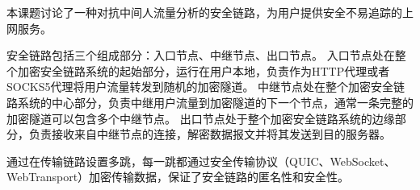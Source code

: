 \begin{conclusions}
本课题讨论了一种对抗中间人流量分析的安全链路，为用户提供安全不易追踪的上网服务。

安全链路包括三个组成部分：入口节点、中继节点、出口节点。
入口节点处在整个加密安全链路系统的起始部分，运行在用户本地，负责作为HTTP代理或者SOCKS5代理将用户流量转发到随机的加密隧道。
中继节点处在整个加密安全链路系统的中心部分，负责中继用户流量到加密隧道的下一个节点，通常一条完整的加密隧道可以包含多个中继节点。
出口节点处于整个加密安全链路系统的边缘部分，负责接收来自中继节点的连接，解密数据报文并将其发送到目的服务器。

通过在传输链路设置多跳，每一跳都通过安全传输协议（QUIC、WebSocket、WebTransport）加密传输数据，保证了安全链路的匿名性和安全性。
\end{conclusions}

